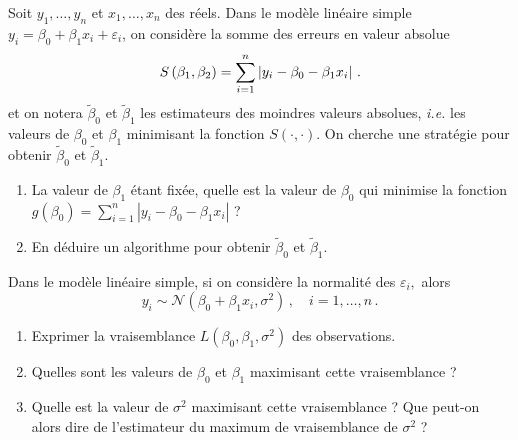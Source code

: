 \documentclass{../headers/td_upc}
\providecommand{\1}{\mathds{1}}
\begin{document}
	\cor{\newpage}
	
	\exo{\!\!\!\!\!\!\!\!*}
	Soit $y_{1}, \ldots, y_{n}$ et $x_{1}, \ldots, x_{n}$ des réels. Dans le modèle linéaire simple $y_{i}=\beta_{0}+\beta_{1} x_{i}+\varepsilon_{i}$, on considère la somme des erreurs en valeur absolue
	\[
	S\left(\beta_{1}, \beta_{2}\right)=\sum_{i=1}^{n}\left\lvert y_{i}-\beta_{0}-\beta_{1} x_{i}\right\rvert\,.
	\]
	et on notera $\tilde{\beta}_{0}$ et $\tilde{\beta}_{1}$ les estimateurs des moindres valeurs absolues, \textit{i.e.} les valeurs de $\beta_{0}$ et $\beta_{1}$ minimisant la fonction $S(\cdot, \cdot)$. On cherche une stratégie pour obtenir $\tilde{\beta}_{0}$ et $\tilde{\beta}_{1}$.
	\begin{enumerate}
		\item La valeur de $\beta_{1}$ étant fixée, quelle est la valeur de $\beta_{0}$ qui minimise la fonction 
		$g\left(\beta_{0}\right)=\sum_{i=1}^{n}\left|y_{i}-\beta_{0}-\beta_{1} x_{i}\right|$ ?
		\item En déduire un algorithme pour obtenir $\tilde{\beta}_{0}$ et $\tilde{\beta}_{1}$.
	\end{enumerate}
	
	
	\cor{\newpage}
	
%	
	
	
	
	Dans le modèle linéaire simple, si on considère la normalité des $\varepsilon_{i},$ alors
	\[
	y_{i} \sim \mathcal{N}\left(\beta_{0}+\beta_{1} x_{i}, \sigma^{2}\right)\,, \quad i=1, \ldots, n\,.
	\]
	\begin{enumerate}
		\item  Exprimer la vraisemblance $L\left(\beta_{0}, \beta_{1}, \sigma^{2}\right)$ des observations.
		\item  Quelles sont les valeurs de $\beta_{0}$ et $\beta_{1}$ maximisant cette vraisemblance ?
		\item  Quelle est la valeur de $\sigma^{2}$ maximisant cette vraisemblance ? Que peut-on alors dire de l'estimateur du maximum de vraisemblance de $\sigma^{2}$ ?
	\end{enumerate}
	
\end{document}
